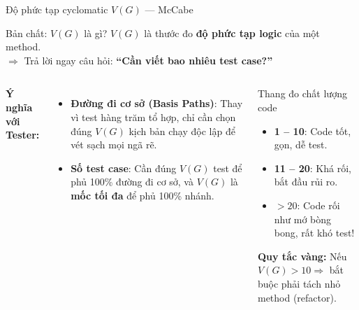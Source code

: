 \documentclass[aspectratio=169,12pt]{beamer}
\begin{document}
\begin{frame}[shrink=5]{Độ phức tạp cyclomatic $V(G)$ --- McCabe}
  \begin{block}{Bản chất: $V(G)$ là gì?}
    $V(G)$ là thước đo \textbf{độ phức tạp logic} của một method.\\
    $\Rightarrow$ Trả lời ngay câu hỏi: \textbf{``Cần viết bao nhiêu test case?''}
  \end{block}

  \vspace{0.2em}
  \begin{columns}[T]
    \textbf{Ý nghĩa với Tester:}
    \begin{itemize}\small
      \item \textbf{Đường đi cơ sở (Basis Paths)}: Thay vì test hàng trăm tổ hợp, chỉ cần chọn đúng $V(G)$ kịch bản chạy độc lập để vét sạch mọi ngã rẽ.
      \item \textbf{Số test case}: Cần đúng $V(G)$ test để phủ 100\% đường đi cơ sở, và $V(G)$ là \textbf{mốc tối đa} để phủ 100\% nhánh.
    \end{itemize}

    \begin{alertblock}{Thang đo chất lượng code}
      \small
      \begin{itemize}
        \item \textbf{1 -- 10}: \textcolor{green!60!black}{Code tốt}, gọn, dễ test.
        \item \textbf{11 -- 20}: \textcolor{orange!90!black}{Khá rối}, bắt đầu rủi ro.
        \item \textbf{$> 20$}: \textcolor{red!80!black}{Code rối như mớ bòng bong}, rất khó test!
      \end{itemize}
      \smallskip
      {\footnotesize \textbf{Quy tắc vàng:} Nếu $V(G) > 10 \Rightarrow$ bắt buộc phải tách nhỏ method (refactor).}
    \end{alertblock}
  \end{columns}
\end{frame}
\end{document}
